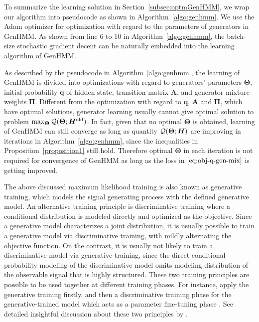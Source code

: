 To summarize the learning solution in Section~\ref{subsec:optmGenHMM}, we wrap our algorithm into pseudocode as shown in Algorithm~\ref{algo:genhmm}. We use the Adam \cite{DBLP:journals/corr/KingmaB14} optimizer for optimization with regard to the parameters of generators in GenHMM. As shown from line $6$ to $10$ in Algorithm~\ref{algo:genhmm}, the batch-size stochastic gradient decent can be naturally embedded into the learning algorithm of GenHMM.

As described by the pseudocode in Algorithm~\ref{algo:genhmm}, the learning of GenHMM is divided into optimizations with regard to generators' parameters $\bm{\Theta}$, initial probability $\bm{q}$ of hidden state, transition matrix $\bm{A}$, and generator mixture weights $\bm{\Pi}$. Different from the optimization with regard to $\bm{q}$, $\bm{A}$ and $\bm{\Pi}$, which have optimal solutions, generator learning usually cannot give optimal solution to problem $\max_{\bm{\Theta}} \mathcal{Q}(\bm{\Theta}; \bm{H}^{\mathrm{old}})$. In fact, given that no optimal $\bm{\Theta}$ is obtained, learning of GenHMM can still converge as long as quantity $\mathcal{Q}(\bm{\Theta}; \bm{H})$ are improving in iterations in Algorithm~\ref{algo:genhmm}, since the inequalities in Proposition~\ref{proposition1} still hold. Therefore optimal $\bm{\Theta}$ in each iteration is not required for convergence of GenHMM as long as the loss in $\eqref{eq:obj-q-gen-mix}$ is getting improved.
\begin{remark}
  \label{chpt7:rmk:generative-discriminative}
  {The above discussed maximum likelihood training is also known as generative training, which models the signal generating process with the defined generative model. An alternative training principle is discriminative training where a conditional distribution is modeled directly and optimized as the objective. Since a generative model characterizes a joint distribution, it is usually possible to train a generative model via discriminative training, with mildly alternating the objective function. On the contrast, it is usually not likely to train a discriminative model via generative training, since the direct conditional probability modeling of the discriminative model omits modeling distribution of the observable signal that is highly structured. These two training principles are possible to be used together at different training phases. For instance, apply the generative training firstly, and then a discriminative training phase for the generative-trained model which acts as a parameter fine-tuning phase \cite{hinton2012deepSpeech}. See detailed insightful discussion about these two principles by \cite{lasserre2006principled}.
  }
\end{remark}


